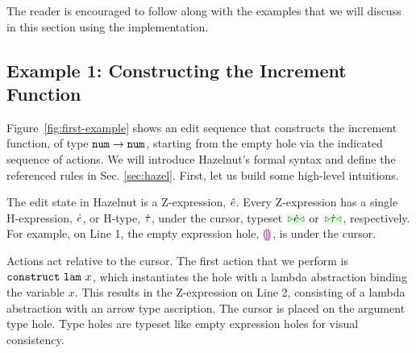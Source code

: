 The reader is encouraged to follow along with the examples that we will discuss in this section using the implementation.

%
\subsection{Example 1: Constructing the Increment Function}

Figure~\ref{fig:first-example} shows an edit sequence that constructs the increment function, of type $\texttt{num} \rightarrow \texttt{num}$, starting from the empty hole via the indicated sequence of {actions}. We will introduce Hazelnut's formal syntax and define the referenced rules in Sec. \ref{sec:hazel}. First, let us build some high-level intuitions. 



The edit state in Hazelnut is a {Z-expression}, $\hat{e}$. Every Z-expression has a single {H-expression}, $\dot{e}$, or {H-type}, $\dot{\tau}$, under the {cursor}, typeset $\zwsel{\hexp}$ or $\zwsel{\htau}$, respectively. For example, on Line 1, the empty expression hole, $\hhole{}$, is under the cursor. 

Actions act relative to the cursor. The first action that we perform is $\mathtt{construct}~\mathtt{lam}~x$, which instantiates the hole with a lambda abstraction binding the variable $x$. This results in the Z-expression on Line 2, consisting of a lambda abstraction with an arrow type ascription. The cursor is placed on the argument type hole. Type holes are typeset like empty expression holes for visual consistency. 

